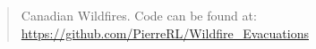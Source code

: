 \begin{abstract}
Canadian Wildfires.
Code can be found at: \url{https://github.com/PierreRL/Wildfire_Evacuations}
\end{abstract}